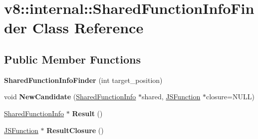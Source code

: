 \hypertarget{classv8_1_1internal_1_1_shared_function_info_finder}{}\section{v8\+:\+:internal\+:\+:Shared\+Function\+Info\+Finder Class Reference}
\label{classv8_1_1internal_1_1_shared_function_info_finder}
\subsection*{Public Member Functions}
\begin{DoxyCompactItemize}
\item 
{\bfseries Shared\+Function\+Info\+Finder} (int target\+\_\+position)\hypertarget{classv8_1_1internal_1_1_shared_function_info_finder_a79a9cb16f297cf409da1e490ab54b66d}{}\label{classv8_1_1internal_1_1_shared_function_info_finder_a79a9cb16f297cf409da1e490ab54b66d}

\item 
void {\bfseries New\+Candidate} (\hyperlink{classv8_1_1internal_1_1_shared_function_info}{Shared\+Function\+Info} $\ast$shared, \hyperlink{classv8_1_1internal_1_1_j_s_function}{J\+S\+Function} $\ast$closure=N\+U\+LL)\hypertarget{classv8_1_1internal_1_1_shared_function_info_finder_a1d008df398d7ac64eed360aea5144cf3}{}\label{classv8_1_1internal_1_1_shared_function_info_finder_a1d008df398d7ac64eed360aea5144cf3}

\item 
\hyperlink{classv8_1_1internal_1_1_shared_function_info}{Shared\+Function\+Info} $\ast$ {\bfseries Result} ()\hypertarget{classv8_1_1internal_1_1_shared_function_info_finder_adbfac679c8b6234b74312d26a150d8c1}{}\label{classv8_1_1internal_1_1_shared_function_info_finder_adbfac679c8b6234b74312d26a150d8c1}

\item 
\hyperlink{classv8_1_1internal_1_1_j_s_function}{J\+S\+Function} $\ast$ {\bfseries Result\+Closure} ()\hypertarget{classv8_1_1internal_1_1_shared_function_info_finder_a77afa850977bbad13be99ac4af55519a}{}\label{classv8_1_1internal_1_1_shared_function_info_finder_a77afa850977bbad13be99ac4af55519a}

\end{DoxyCompactItemize}
